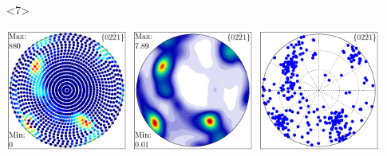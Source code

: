 \documentclass[comptress]{beamer}
\begin{document}
\begin{frame}[fragile]
\begin{overlayarea}{\textwidth}{5cm}
\begin{onlyenv}<7>
  \centerline{
  \includegraphics[height=4cm]{pic/pf1}
  \includegraphics[height=4cm]{pic/pdf1}
  \includegraphics[height=4cm]{pic/ebsd1}
  }
\end{onlyenv}


\end{overlayarea}
\end{frame}
\end{document}

